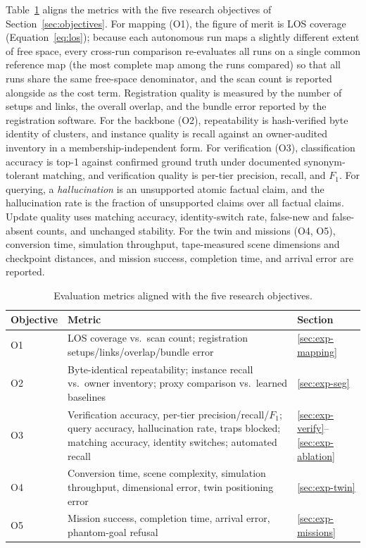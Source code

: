 Table~\ref{tab:metrics} aligns the metrics with the five research objectives
of Section~\ref{sec:objectives}. For mapping (O1), the figure of merit is LOS
coverage (Equation~\ref{eq:los}); because each autonomous run maps a slightly
different extent of free space, every cross-run comparison re-evaluates all
runs on a single common reference map (the most complete map among the runs
compared) so that all runs share the same free-space denominator, and the scan
count is reported alongside as the cost term. Registration quality is measured
by the number of setups and links, the overall overlap, and the bundle error
reported by the registration software. For the backbone (O2), repeatability is hash-verified
byte identity of clusters, and instance quality is recall against an
owner-audited inventory in a membership-independent form. For verification
(O3), classification accuracy is top-1 against confirmed ground truth under
documented synonym-tolerant matching, and verification quality is per-tier
precision, recall, and $F_1$. For querying, a \emph{hallucination} is an
unsupported atomic factual claim, and the hallucination rate is the fraction
of unsupported claims over all factual claims. Update quality uses matching accuracy, identity-switch rate,
false-new and false-absent counts, and unchanged stability. For the twin and
missions (O4, O5), conversion time, simulation throughput, tape-measured scene
dimensions and checkpoint distances, and mission success, completion time, and
arrival error are reported.

\begin{table}[htbp]
  \centering
  \caption{Evaluation metrics aligned with the five research objectives.}
  \label{tab:metrics}
  \begin{tabularx}{\textwidth}{l X X}
    \toprule
    \textbf{Objective} & \textbf{Metric} & \textbf{Section} \\
    \midrule
    O1 & LOS coverage vs.\ scan count; registration setups/links/overlap/bundle error & \ref{sec:exp-mapping} \\
    O2 & Byte-identical repeatability; instance recall vs.\ owner inventory; proxy comparison vs.\ learned baselines & \ref{sec:exp-seg} \\
    O3 & Verification accuracy, per-tier precision/recall/$F_1$; query accuracy, hallucination rate, traps blocked; matching accuracy, identity switches; automated recall & \ref{sec:exp-verify}--\ref{sec:exp-ablation} \\
    O4 & Conversion time, scene complexity, simulation throughput, dimensional error, twin positioning error & \ref{sec:exp-twin} \\
    O5 & Mission success, completion time, arrival error, phantom-goal refusal & \ref{sec:exp-missions} \\
    \bottomrule
  \end{tabularx}
\end{table}

